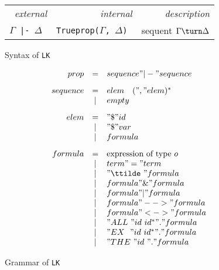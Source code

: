 \begin{figure}
\begin{center}
\begin{tabular}{rrr} 
  \it external		& \it internal	& \it description \\ 
  \tt $\Gamma$ |- $\Delta$  &  \tt Trueprop($\Gamma$, $\Delta$) &
        sequent $\Gamma\turn \Delta$ 
\end{tabular}
\end{center}
\caption{Syntax of {\tt LK}} \label{lk-syntax}
\end{figure}


\begin{figure} 
\dquotes
\[\begin{array}{rcl}
    prop & = & sequence " |- " sequence 
\\[2ex]
sequence & = & elem \quad (", " elem)^* \\
         & | & empty 
\\[2ex]
    elem & = & "\$ " id \\
         & | & "\$ " var \\
         & | & formula 
\\[2ex]
 formula & = & \hbox{expression of type~$o$} \\
	 & | & term " = " term \\
	 & | & "\ttilde\ " formula \\
	 & | & formula " \& " formula \\
	 & | & formula " | " formula \\
	 & | & formula " --> " formula \\
	 & | & formula " <-> " formula \\
	 & | & "ALL~" id~id^* " . " formula \\
	 & | & "EX~~" id~id^* " . " formula \\
	 & | & "THE~" id~     " . " formula
  \end{array}
\]
\caption{Grammar of {\tt LK}} \label{lk-grammar}
\end{figure}



